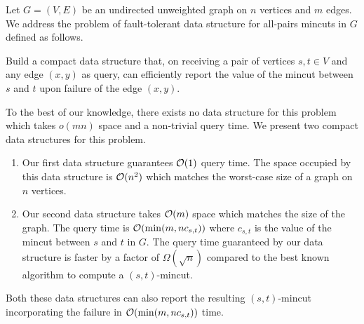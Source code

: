% 
% 
%

Let $G=(V,E)$ be an undirected unweighted graph on $n$ vertices and $m$ edges. We address the problem of fault-tolerant data structure for all-pairs mincuts in $G$ defined as follows.

Build a compact data structure that, on receiving a pair of vertices $s,t\in V$ and any edge $(x,y)$ as query, can efficiently report the value of the mincut between $s$ and $t$ upon failure of the edge $(x,y)$.

To the best of our knowledge, there exists no data structure for this problem which takes $o(mn)$ space and a non-trivial query time. We present two compact data structures for this problem.
\begin{enumerate}
\item Our first data structure guarantees ${\cal O}(1)$ query time. The space occupied by this data structure is ${\cal O}(n^2)$ which matches the worst-case size of a graph on $n$ vertices.
\item
Our second data structure takes ${\cal O}(m)$ space which 
matches the size of the graph. The query time is ${\cal O}(\min(m,n c_{s,t}))$ where $c_{s,t}$ is the value of the mincut between $s$ and $t$ in $G$. The query time guaranteed by our data structure is faster by a factor of $\Omega(\sqrt{n})$ compared to the best known algorithm \cite{DBLP:conf/focs/GoldbergR97a,DBLP:conf/stoc/KargerL98} to compute a $(s,t)$-mincut.
\end{enumerate}


Both these data structures can also report the resulting $(s,t)$-mincut incorporating the failure in ${\cal O}(\min(m,n c_{s,t}))$ time.
